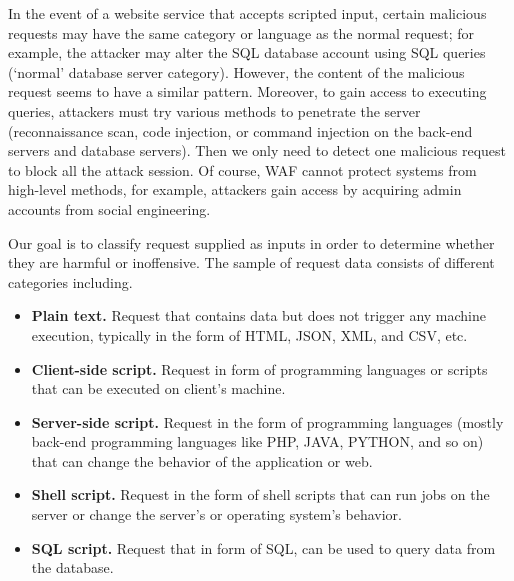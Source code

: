 In the event of a website service that accepts scripted input, certain malicious requests may have the same category or language as the normal request; for example, the attacker may alter the SQL database account using SQL queries (`normal' database server category). However, the content of the malicious request seems to have a similar pattern. Moreover, to gain access to executing queries, attackers must try various methods to penetrate the server (reconnaissance scan, code injection, or command injection on the back-end servers and database servers). Then we only need to detect one malicious request to block all the attack session. Of course, WAF cannot protect systems from high-level methods, for example, attackers gain access by acquiring admin accounts from social engineering.

Our goal is to classify request supplied as inputs in order to determine whether they are harmful or inoffensive. The sample of request data consists of different categories including.
\begin{itemize}
    \item \textbf{Plain text.} Request that contains data but does not trigger any machine execution, typically in the form of HTML, JSON, XML, and CSV, etc.
    \item \textbf{Client-side script.} Request in form of programming languages or scripts that can be executed on client's machine.
    \item \textbf{Server-side script.} Request in the form of programming languages (mostly back-end programming languages like PHP, JAVA, PYTHON, and so on) that can change the behavior of the application or web.
    \item \textbf{Shell script.} Request in the form of shell scripts that can run jobs on the server or change the server's or operating system's behavior.
    \item \textbf{SQL script.} Request that in form of SQL, can be used to query data from the database.
\end{itemize}

